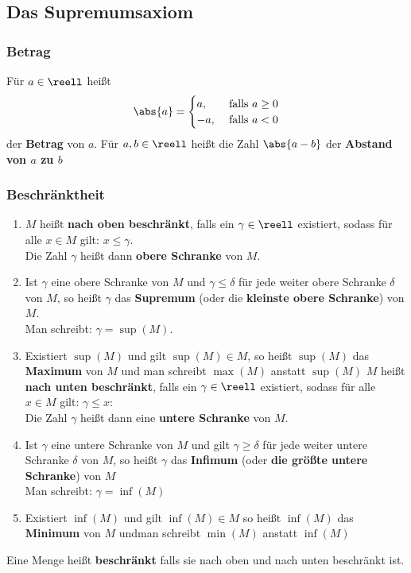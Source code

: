 \documentclass{kit}
\begin{document}
  \subsection{Das Supremumsaxiom}
    \subsubsection{Betrag}
      Für $a\in\reell$ heißt
      $$\abs{a}=\begin{cases}
        a, &\text{ falls }a\ge 0\\
        -a, & \text{ falls }a<0
      \end{cases}$$
      der \textbf{Betrag} von $a$. Für $a,b\in\reell$ heißt die Zahl $\abs{a-b}$ der \textbf{Abstand von $a$ zu $b$}
    \subsubsection{Beschränktheit}
      \begin{enumerate}[label=\arabic*)]
        \item $M$ heißt \textbf{nach oben beschränkt}, falls ein $\gamma\in\reell$ existiert, sodass für alle $x\in M$ gilt: $x\le \gamma$.\\
          Die Zahl $\gamma$ heißt dann \textbf{obere Schranke} von $M$.
        \item Ist $\gamma$ eine obere Schranke von $M$ und $\gamma\le\delta$ für jede weiter obere Schranke $\delta$ von $M$, so heißt $\gamma$ das \textbf{Supremum} (oder die \textbf{kleinste obere Schranke}) von $M$.\\
          Man schreibt: $\gamma=\sup(M)$.
        \item Existiert $\sup(M)$ und gilt $\sup(M)\in M$, so heißt $\sup(M)$ das \textbf{Maximum} von $M$ und man schreibt $\max(M)$ anstatt $\sup(M)$
          $M$ heißt \textbf{nach unten beschränkt}, falls ein $\gamma\in\reell$ existiert, sodass für alle $x\in M$ gilt: $\gamma\le x$:\\
          Die Zahl $\gamma$ heißt dann eine \textbf{untere Schranke} von $M$.
        \item Ist $\gamma$ eine untere Schranke von $M$ und gilt $\gamma\ge\delta$ für jede weiter untere Schranke $\delta$ von $M$, so heißt $\gamma$ das \textbf{Infimum} (oder \textbf{die größte untere Schranke}) von $M$\\
          Man schreibt: $\gamma=\inf(M)$
        \item Existiert $\inf(M)$ und gilt $\inf(M)\in M$ so heißt $\inf(M)$ das \textbf{Minimum} von $M$ undman schreibt $\min(M)$ anstatt $\inf(M)$
      \end{enumerate}
      Eine Menge heißt \textbf{beschränkt} falls sie nach oben und nach unten beschränkt ist.
\end{document}
